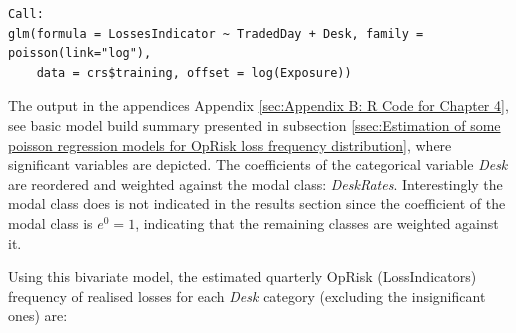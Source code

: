 \documentclass{DissertateUSU}
\begin{document}
\singlespacing

\doublespacing

\singlespacing
\begin{verbatim}
Call:
glm(formula = LossesIndicator ~ TradedDay + Desk, family = poisson(link="log"), 
    data = crs$training, offset = log(Exposure))

\end{verbatim}
\doublespacing

The output in the appendices Appendix
\ref{sec:Appendix B: R Code for Chapter 4}, see basic model build
summary presented in subsection
\ref{ssec:Estimation of some poisson regression models for OpRisk loss frequency distribution},
where significant variables are depicted. The coefficients of the
categorical variable \emph{Desk} are reordered and weighted against the
modal class: \emph{DeskRates}. Interestingly the modal class does is not
indicated in the results section since the coefficient of the modal
class is \(e^0 = 1\), indicating that the remaining classes are weighted
against it.

\singlespacing

\doublespacing

Using this bivariate model, the estimated quarterly OpRisk
(LossIndicators) frequency of realised losses for each \emph{Desk}
category (excluding the insignificant ones) are:
\end{document}
